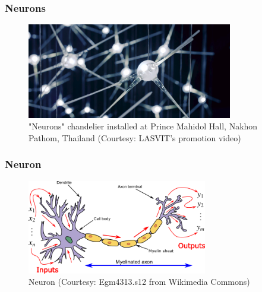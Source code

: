 \documentclass[aspectratio=169]{beamer}
\begin{document}
\begin{frame}
	\frametitle{Neurons}
	\begin{center}
		\begin{figure}
			\includegraphics[width=0.8\textwidth]{imgs/neurons_pmh.png}
			\caption{"Neurons" chandelier installed at Prince Mahidol Hall, Nakhon Pathom, Thailand (Courtesy: LASVIT's promotion video)}
		\end{figure}
	\end{center}
\end{frame}

\begin{frame}
	\frametitle{Neuron}
	\begin{center}
		\begin{figure}
			\includegraphics[width=0.7\textwidth]{imgs/neuron.png}
			\caption{Neuron (Courtesy: Egm4313.s12 from Wikimedia Commons)}
		\end{figure}
	\end{center}
\end{frame}
\end{document}
